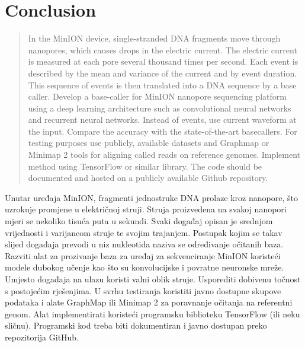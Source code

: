 \documentclass[times, utf8, diplomski, english]{fer}
\begin{document}
\chapter{Conclusion}



% 

\begin{abstract}
In the MinION device, single-stranded DNA fragments move through nanopores, which causes drops in the electric current. The electric current is measured at each pore several thousand times per second. Each event is described by the mean and variance of the current and by event duration. This sequence of events is then translated into a DNA sequence by a base caller. Develop a base-caller for MinION nanopore sequencing platform using a deep learning architecture such as convolutional neural networks and recurrent neural networks. Instead of events, use current waveform at the input. Compare the accuracy with the state-of-the-art basecallers. For testing purposes use publicly, available datasets and Graphmap or Minimap 2 tools for aligning called reads on reference genomes.  Implement method using TensorFlow or similar library. The code should be documented and hosted on a publicly available Github repository.

\end{abstract}

\begin{sazetak}
    Unutar uređaja MinION, fragmenti jednostruke DNA prolaze kroz nanopore, što uzrokuje promjene u električnoj struji. Struja proizvedena na svakoj nanopori mjeri se nekoliko tisuća puta u sekundi. Svaki događaj opisan je srednjom vrijednosti i varijancom struje te svojim trajanjem. Postupak kojim se takav slijed događaja prevodi u niz nukleotida naziva se određivanje očitanih baza. Razviti alat za prozivanje baza za uređaj za sekvenciranje MinION koristeći modele dubokog učenje kao što su konvolucijske i povratne neuronske mreže. Umjesto događaja na ulazu koristi valni oblik struje. Usporediti dobivenu točnost s postojećim rješenjima. U svrhu testiranja koristiti javno dostupne skupove podataka i alate GraphMap ili Minimap 2 za poravnanje očitanja na referentni genom. Alat implementirati koristeći programsku biblioteku TensorFlow (ili neku sličnu). Programski kod treba biti dokumentiran i javno dostupan preko repozitorija GitHub.
\end{sazetak}
\end{document}
